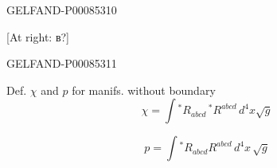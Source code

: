 \begin{GelfandAdjacentEvidence}{GELFAND-P000853}{10}


[At right: в?]
\end{GelfandAdjacentEvidence}
\begin{GelfandAdjacentEvidence}{GELFAND-P000853}{11}


Def. \(\chi\) and \(p\) for manifs. without boundary
\[
\chi=\int {}^*R_{abcd}\,{}^*R^{abcd}\,d^4x\sqrt{g}\tag{44}
\]
\end{GelfandAdjacentEvidence}

\[
p=\int {}^*R_{abcd}R^{abcd}\,d^4x\,\sqrt{g}\tag{45}
\]


